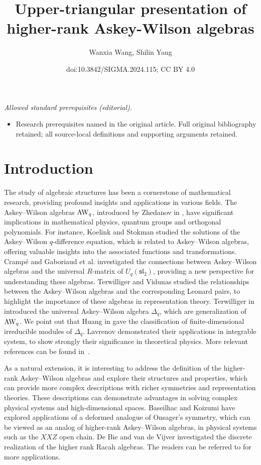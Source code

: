\documentclass[10pt,a4paper]{amsart}
\title{Upper-triangular presentation of higher-rank Askey-Wilson algebras}
\author{Wanxia Wang, Shilin Yang}
\date{doi:10.3842/SIGMA.2024.115; CC BY 4.0}
\numberwithin{equation}{section}
\begin{document}
\maketitle
\noindent\textit{Allowed standard prerequisites (editorial).}\begin{itemize}
\item Research prerequisites named in the original article. Full original bibliography retained; all source-local definitions and supporting arguments retained.
\end{itemize}\medskip
\section{Introduction}
The study of algebraic structures has been a cornerstone of mathematical research, providing profound insights and applications in various fields.
The Askey--Wilson algebras ${\rm AW}_q$, introduced by Zhedanov in \cite{Zhe(1991)}, have significant implications in mathematical physics, quantum groups and orthogonal polynomials.
For instance, Koelink and Stokman \cite{KS(2001)} studied the solutions of the Askey--Wilson $q$-difference equation, which is related to Askey--Wilson algebras, offering valuable insights into the associated functions and transformations.
Cramp\'{e} and Gaboriaud et al. \cite{CGVZ(2020)} investigated the connections between Askey--Wilson algebras and the universal $R$-matrix of $U_q(\mathfrak{sl}_2)$, providing a new perspective for understanding these algebras.
Terwilliger and Vidunas \cite{TV(2004)} studied the relationships between the Askey--Wilson algebras and the corresponding Leonard pairs, to highlight the importance of these algebras in representation theory.
Terwilliger in \cite{Ter(2011)} introduced the universal Askey--Wilson algebra $\Delta_q$, which are generalization of ${\rm AW}_q$.
We point out that Huang in \cite{Huang(2015),Huang(2021)} gave the classification of finite-dimensional irreducible modules of $\Delta_q$.
Lavrenov \cite{Lav(1997)} demonstrated their applications in integrable system, to show strongly their significance in theoretical physics.
More relevant references can be found in~\cite{CFGPRV(2021),CVZ(2021),GW(2023),Koor(2007),Koor(2008)}.

As a natural extension, it is interesting to address the definition of the higher-rank
Askey--Wilson algebras and explore their structures and properties, which can provide more complex descriptions with richer symmetries and representation theories.
These descriptions can demonstrate advantages in solving complex physical systems and high-dimensional spaces.
Baseilhac and Koizumi \cite{BK(2005)} have explored applications of a deformed analogue of Onsager's symmetry,
which can be viewed as an analog of higher-rank Askey--Wilson algebras, in physical systems such as the $XXZ$ open chain.
De Bie and van de Vijver \cite{DV(2020)} investigated the discrete realization of the higher rank Racah algebras.
The readers can be referred to \cite{CL(2022),DDV(2020),De(2019),PW(2017)} for more applications.
\end{document}
